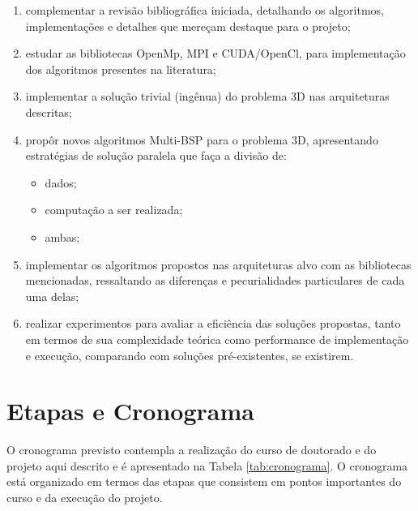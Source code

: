 \documentclass[a4paper, 12pt] {article}
\begin{document}
\begin{enumerate}
  \item complementar a revisão bibliográfica iniciada, detalhando os
  algoritmos, implementações e detalhes que mereçam destaque para o projeto;
  \item estudar as bibliotecas OpenMp, MPI e CUDA/OpenCl, para implementação
  dos algoritmos presentes na literatura;
  \item implementar a solução trivial (ingênua) do problema 3D nas arquiteturas
  descritas;
  \item propôr novos algoritmos Multi-BSP para o problema 3D, apresentando
  estratégias de solução paralela que faça a divisão de:
  	\begin{itemize}
  	  \item dados;
  	  \item computação a ser realizada;
  	  \item ambas;
  	\end{itemize}
  \item implementar os algoritmos propostos nas arquiteturas alvo com as
  bibliotecas mencionadas, ressaltando as diferenças e pecurialidades
  particulares de cada uma delas;
  \item realizar experimentos para avaliar a eficiência das soluções propostas,
  tanto em termos de sua complexidade teórica como performance de implementação
  e execução, comparando com soluções pré-existentes, se existirem.
\end{enumerate}

\section{Etapas e Cronograma}

O cronograma previsto contempla a realização do curso de doutorado e do projeto
aqui descrito e é apresentado na Tabela \ref{tab:cronograma}. O cronograma está
organizado em termos das etapas que consistem em pontos importantes do curso e da execução do projeto.
\end{document}
